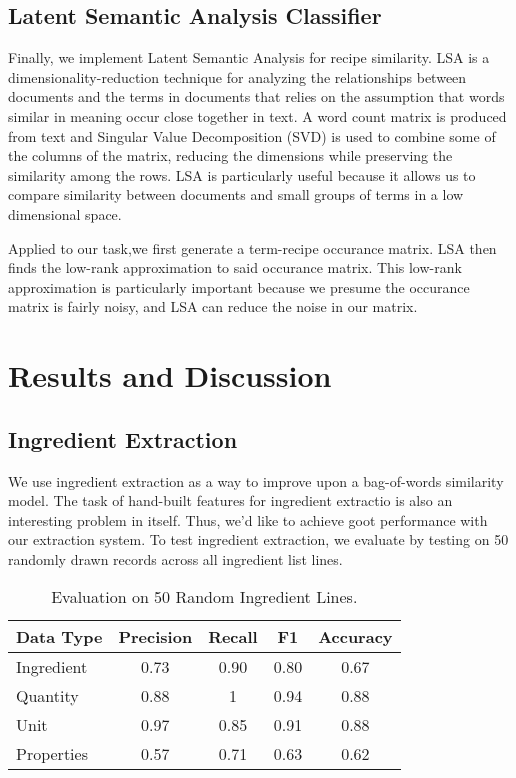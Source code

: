 \documentclass[11pt]{article}
\begin{document}
\subsection{Latent Semantic Analysis Classifier}

Finally, we implement Latent Semantic Analysis for recipe similarity. LSA is a dimensionality-reduction technique for analyzing the relationships between documents and the terms in documents that relies on the assumption that words similar in meaning occur close together in text. A word count matrix is produced from text and Singular Value Decomposition (SVD) is used to combine some of the columns of the matrix, reducing the dimensions while preserving the similarity among the rows. LSA is particularly useful because it allows us to compare similarity between documents and small groups of terms in a low dimensional space. 

Applied to our task,we first generate a term-recipe occurance matrix. LSA then finds the low-rank approximation to said occurance matrix. This low-rank approximation is particularly important because we presume the occurance matrix is fairly noisy, and LSA can reduce the noise in our matrix. 

\section{Results and Discussion}

\subsection{Ingredient Extraction}

We use ingredient extraction as a way to improve upon a bag-of-words similarity model. The task of hand-built features for ingredient extractio is also an interesting problem in itself. Thus, we'd like to achieve goot performance with our extraction system. To test ingredient extraction, we evaluate by testing on 50 randomly drawn records across all ingredient list lines. 

\begin{table}[h]
\begin{center}
\begin{tabular}{|l|cc|c|c|}
\hline\bf Data Type & \bf Precision & \bf Recall &  \bf F1 & \bf Accuracy\\ \hline
Ingredient & 0.73 & 0.90 & 0.80 &0.67 \\
Quantity & 0.88 & 1 & 0.94 & 0.88 \\
Unit & 0.97 & 0.85 & 0.91 & 0.88 \\
Properties & 0.57 & 0.71 & 0.63 & 0.62 \\
\hline
\end{tabular}
\end{center}
\caption{\label{font-table}Evaluation on 50 Random Ingredient Lines. }
\end{table}
\end{document}
